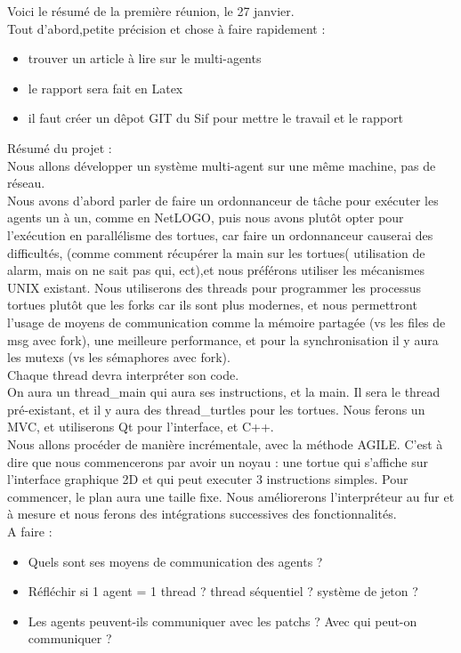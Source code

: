 \documentclass{article}
\begin{document}
Voici le résumé de la première réunion, le 27 janvier.\\
Tout d'abord,petite précision et chose à faire rapidement :
\begin{itemize}
\item  trouver un article à lire sur le multi-agents
\item le rapport sera fait en Latex
\item il faut créer un dêpot GIT du Sif pour mettre le travail et le rapport
\end{itemize}

Résumé du projet :\\
Nous allons développer un système multi-agent sur une même machine, pas de réseau.\\
Nous avons d'abord parler de faire un ordonnanceur de tâche pour exécuter les agents un à un, comme en NetLOGO, puis nous avons plutôt opter pour l’exécution en parallélisme des tortues, car faire un ordonnanceur causerai des difficultés, (comme comment récupérer la main sur les tortues( utilisation de alarm, mais on ne sait pas qui, ect),et nous préférons utiliser les mécanismes UNIX existant.
Nous utiliserons des threads pour programmer les processus tortues plutôt que les forks car ils sont plus modernes, et nous permettront l'usage de moyens de communication comme la mémoire partagée (vs les files de msg avec fork), une meilleure performance, et pour la synchronisation il y aura les mutexs (vs les sémaphores avec fork).\\
Chaque thread devra interpréter son code.\\
On aura un thread\_main qui aura ses instructions, et la main. Il sera le thread pré-existant, et il y aura des thread\_turtles pour les tortues.
Nous ferons un MVC, et utiliserons Qt pour l'interface, et C++.\\
Nous allons procéder de manière incrémentale, avec la méthode AGILE. C'est à dire que nous commencerons par avoir un noyau : une tortue qui s'affiche sur l'interface graphique 2D et qui peut executer 3 instructions simples. Pour commencer, le plan aura une taille fixe. Nous améliorerons l'interpréteur au fur et à mesure et nous ferons des intégrations successives des fonctionnalités.\\

A faire :
\begin{itemize}
\item Quels sont ses moyens de communication des agents ? 
\item Réfléchir si 1 agent = 1 thread ? thread séquentiel ? système de jeton ? 
\item Les agents peuvent-ils communiquer avec les patchs ? Avec qui peut-on communiquer ?
\end{itemize}
\end{document}
